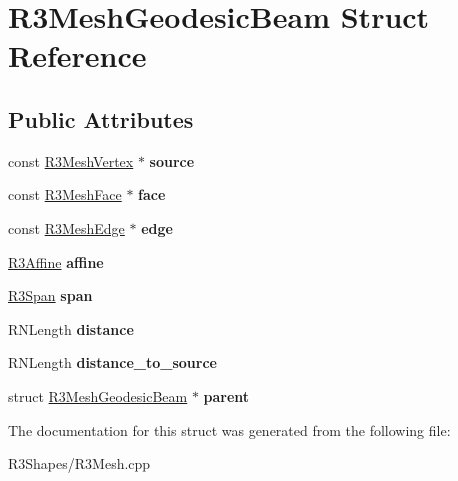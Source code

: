 \hypertarget{struct_r3_mesh_geodesic_beam}{}\section{R3\+Mesh\+Geodesic\+Beam Struct Reference}
\label{struct_r3_mesh_geodesic_beam}
\subsection*{Public Attributes}
\begin{DoxyCompactItemize}
\item 
const \hyperlink{class_r3_mesh_vertex}{R3\+Mesh\+Vertex} $\ast$ {\bfseries source}\hypertarget{struct_r3_mesh_geodesic_beam_ac2c65b493f37792a29ac2484584c5b32}{}\label{struct_r3_mesh_geodesic_beam_ac2c65b493f37792a29ac2484584c5b32}

\item 
const \hyperlink{class_r3_mesh_face}{R3\+Mesh\+Face} $\ast$ {\bfseries face}\hypertarget{struct_r3_mesh_geodesic_beam_af71d432a58268173deef6bf79d94e808}{}\label{struct_r3_mesh_geodesic_beam_af71d432a58268173deef6bf79d94e808}

\item 
const \hyperlink{class_r3_mesh_edge}{R3\+Mesh\+Edge} $\ast$ {\bfseries edge}\hypertarget{struct_r3_mesh_geodesic_beam_a31c2f0aafff642d31b9bd5dafe1f8a04}{}\label{struct_r3_mesh_geodesic_beam_a31c2f0aafff642d31b9bd5dafe1f8a04}

\item 
\hyperlink{class_r3_affine}{R3\+Affine} {\bfseries affine}\hypertarget{struct_r3_mesh_geodesic_beam_abc3dfa6c75411942bb7b509ad1e9ec36}{}\label{struct_r3_mesh_geodesic_beam_abc3dfa6c75411942bb7b509ad1e9ec36}

\item 
\hyperlink{class_r3_span}{R3\+Span} {\bfseries span}\hypertarget{struct_r3_mesh_geodesic_beam_af166a8b761ff10d40b181f37f5c3cedf}{}\label{struct_r3_mesh_geodesic_beam_af166a8b761ff10d40b181f37f5c3cedf}

\item 
R\+N\+Length {\bfseries distance}\hypertarget{struct_r3_mesh_geodesic_beam_a685f8feb93cee793bfb7dc01a7a920b8}{}\label{struct_r3_mesh_geodesic_beam_a685f8feb93cee793bfb7dc01a7a920b8}

\item 
R\+N\+Length {\bfseries distance\+\_\+to\+\_\+source}\hypertarget{struct_r3_mesh_geodesic_beam_a27ff399660a1a013aaff377c7a1e3b8a}{}\label{struct_r3_mesh_geodesic_beam_a27ff399660a1a013aaff377c7a1e3b8a}

\item 
struct \hyperlink{struct_r3_mesh_geodesic_beam}{R3\+Mesh\+Geodesic\+Beam} $\ast$ {\bfseries parent}\hypertarget{struct_r3_mesh_geodesic_beam_ab3aa810f30d9db4f38c1821dd8328a77}{}\label{struct_r3_mesh_geodesic_beam_ab3aa810f30d9db4f38c1821dd8328a77}

\end{DoxyCompactItemize}


The documentation for this struct was generated from the following file\+:\begin{DoxyCompactItemize}
\item 
R3\+Shapes/R3\+Mesh.\+cpp\end{DoxyCompactItemize}
